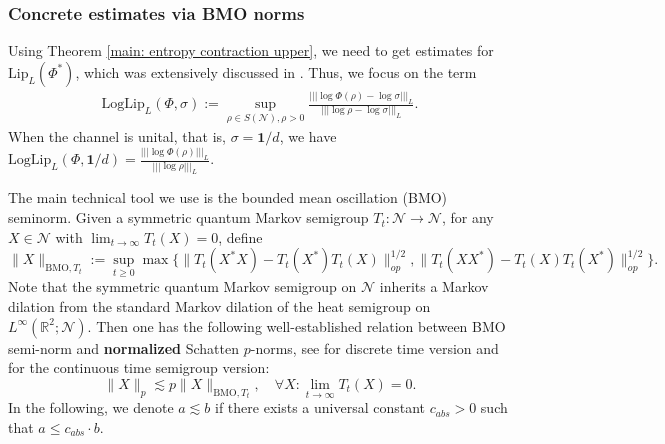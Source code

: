 \documentclass[11pt,reqno]{amsart}
\numberwithin{equation}{section}
\newcommand{\mb}{\mathbb}
\newcommand{\mc}{\mathcal}
\newcommand{\Lip}{\mathrm{Lip}}
\begin{document}

\subsubsection{Concrete estimates via BMO norms}
Using Theorem \ref{main: entropy contraction upper}, we need to get estimates for $\Lip_L(\Phi^*)$, which was extensively discussed in \cite{gaorouze24}. Thus, we focus on the term 
\begin{align}\label{def:log Lipschitz constant}
    \mathrm{Log}\Lip_L(\Phi,\sigma):= \sup_{\rho \in S(\mc N), \rho>0}\frac{|||\log \Phi(\rho) - \log \sigma|||_L}{|||\log \rho - \log \sigma|||_L}.
\end{align}
When the channel is unital, that is, $\sigma = \textbf{1}/d$, we have $\mathrm{Log}\Lip_L(\Phi,\textbf{1}/d) = \frac{|||\log \Phi(\rho)|||_L}{|||\log \rho|||_L}$. 

The main technical tool we use is the bounded mean oscillation (BMO) seminorm. Given a symmetric quantum Markov semigroup $T_t: \mc N \to \mc N$, for any $X \in \mc N$ with $\lim_{t\to \infty} T_t(X) = 0$, define 
    \begin{equation}
        \|X\|_{\mathrm{BMO}, T_t}:= \sup_{t\ge 0} \max\{ \|T_t(X^*X) - T_t(X^*)T_t(X)\|_{op}^{1/2}, \|T_t(XX^*) - T_t(X)T_t(X^*)\|_{op}^{1/2} \}.
    \end{equation}
Note that the symmetric quantum Markov semigroup on $\mc N$ inherits a Markov dilation from the standard Markov dilation of the heat semigroup on $L^\infty(\mb R^2;\mc N)$. Then one has the following well-established relation between BMO semi-norm and \textbf{normalized} Schatten $p$-norms, see \cite{junge2007noncommutative} for discrete time version and \cite[Theorem 0.2]{junge2012bmo} for the continuous time semigroup version: 
\begin{equation}\label{BMO to Schatten p}
    \|X\|_p \lesssim p \|X\|_{\mathrm{BMO}, T_t},\quad \forall X:\lim_{t\to \infty} T_t(X) = 0. 
\end{equation}
In the following, we denote $a \lesssim b$ if there exists a universal constant $c_{abs}>0$ such that $a \le c_{abs}\cdot b$. 
\end{document}
